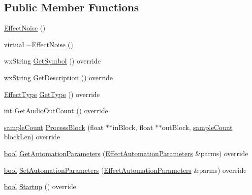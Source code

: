 \subsection*{Public Member Functions}
\begin{DoxyCompactItemize}
\item 
\hyperlink{class_effect_noise_ae0d2006f357dc937c9598fe8321cad79}{Effect\+Noise} ()
\item 
virtual \hyperlink{class_effect_noise_af3867aa81e2a8db3d06348bd5066190d}{$\sim$\+Effect\+Noise} ()
\item 
wx\+String \hyperlink{class_effect_noise_a3090aa04fc52056dc7b9b81c718fc398}{Get\+Symbol} () override
\item 
wx\+String \hyperlink{class_effect_noise_a92cd8ca922e7bf105c69ca80c909793c}{Get\+Description} () override
\item 
\hyperlink{_effect_interface_8h_a4809a7bb3fd1a421902a667cc1405d43}{Effect\+Type} \hyperlink{class_effect_noise_a95505ee60e250f66fa33850875bf7545}{Get\+Type} () override
\item 
\hyperlink{xmltok_8h_a5a0d4a5641ce434f1d23533f2b2e6653}{int} \hyperlink{class_effect_noise_a240b36bc7118e2b77b77ec8fc322c93c}{Get\+Audio\+Out\+Count} () override
\item 
\hyperlink{include_2audacity_2_types_8h_afa427e1f521ea5ec12d054e8bd4d0f71}{sample\+Count} \hyperlink{class_effect_noise_a33924b2a09cb0d0e1c1a2b80f48cfeee}{Process\+Block} (float $\ast$$\ast$in\+Block, float $\ast$$\ast$out\+Block, \hyperlink{include_2audacity_2_types_8h_afa427e1f521ea5ec12d054e8bd4d0f71}{sample\+Count} block\+Len) override
\item 
\hyperlink{mac_2config_2i386_2lib-src_2libsoxr_2soxr-config_8h_abb452686968e48b67397da5f97445f5b}{bool} \hyperlink{class_effect_noise_af98c27bc1e749976cc786c1164b36616}{Get\+Automation\+Parameters} (\hyperlink{class_effect_automation_parameters}{Effect\+Automation\+Parameters} \&parms) override
\item 
\hyperlink{mac_2config_2i386_2lib-src_2libsoxr_2soxr-config_8h_abb452686968e48b67397da5f97445f5b}{bool} \hyperlink{class_effect_noise_a674ec7ab7a1956875f68dce5f7420f88}{Set\+Automation\+Parameters} (\hyperlink{class_effect_automation_parameters}{Effect\+Automation\+Parameters} \&parms) override
\item 
\hyperlink{mac_2config_2i386_2lib-src_2libsoxr_2soxr-config_8h_abb452686968e48b67397da5f97445f5b}{bool} \hyperlink{class_effect_noise_ac5e7418c7186fe79a5a40956fb7fa88d}{Startup} () override
\item 

\end{DoxyCompactItemize}
